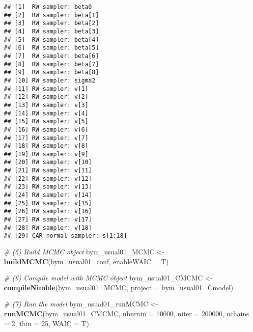 \documentclass[]{article}
\newenvironment{Shaded}{\begin{snugshade}}{\end{snugshade}}
\newcommand{\CommentTok}[1]{\textcolor[rgb]{0.56,0.35,0.01}{\textit{#1}}}
\newcommand{\DataTypeTok}[1]{\textcolor[rgb]{0.13,0.29,0.53}{#1}}
\newcommand{\DecValTok}[1]{\textcolor[rgb]{0.00,0.00,0.81}{#1}}
\newcommand{\KeywordTok}[1]{\textcolor[rgb]{0.13,0.29,0.53}{\textbf{#1}}}
\newcommand{\NormalTok}[1]{#1}
\newcommand{\OperatorTok}[1]{\textcolor[rgb]{0.81,0.36,0.00}{\textbf{#1}}}
\newcommand{\StringTok}[1]{\textcolor[rgb]{0.31,0.60,0.02}{#1}}
\begin{document}
\begin{Shaded}
\end{Shaded}

\begin{verbatim}
## [1]  RW sampler: beta0
## [2]  RW sampler: beta[1]
## [3]  RW sampler: beta[2]
## [4]  RW sampler: beta[3]
## [5]  RW sampler: beta[4]
## [6]  RW sampler: beta[5]
## [7]  RW sampler: beta[6]
## [8]  RW sampler: beta[7]
## [9]  RW sampler: beta[8]
## [10] RW sampler: sigma2
## [11] RW sampler: v[1]
## [12] RW sampler: v[2]
## [13] RW sampler: v[3]
## [14] RW sampler: v[4]
## [15] RW sampler: v[5]
## [16] RW sampler: v[6]
## [17] RW sampler: v[7]
## [18] RW sampler: v[8]
## [19] RW sampler: v[9]
## [20] RW sampler: v[10]
## [21] RW sampler: v[11]
## [22] RW sampler: v[12]
## [23] RW sampler: v[13]
## [24] RW sampler: v[14]
## [25] RW sampler: v[15]
## [26] RW sampler: v[16]
## [27] RW sampler: v[17]
## [28] RW sampler: v[18]
## [29] CAR_normal sampler: s[1:18]
\end{verbatim}

\begin{Shaded}
\begin{Highlighting}[]
\CommentTok{# (5) Build MCMC object}
\NormalTok{bym_usual01_MCMC <-}\StringTok{ }\KeywordTok{buildMCMC}\NormalTok{(bym_usual01_conf, }\DataTypeTok{enableWAIC =}\NormalTok{ T) }

\CommentTok{# (6) Compile model with MCMC object}
\NormalTok{bym_usual01_CMCMC <-}\StringTok{ }\KeywordTok{compileNimble}\NormalTok{(bym_usual01_MCMC, }\DataTypeTok{project =}\NormalTok{ bym_usual01_Cmodel)  }

\CommentTok{# (7) Run the model}
\NormalTok{bym_usual01_runMCMC <-}\StringTok{ }\KeywordTok{runMCMC}\NormalTok{(bym_usual01_CMCMC, }\DataTypeTok{nburnin =} \DecValTok{10000}\NormalTok{, }\DataTypeTok{niter =} \DecValTok{200000}\NormalTok{, }\DataTypeTok{nchains =} \DecValTok{2}\NormalTok{, }\DataTypeTok{thin =} \DecValTok{25}\NormalTok{, }\DataTypeTok{WAIC =}\NormalTok{ T)}
\end{Highlighting}
\end{Shaded}
\end{document}
